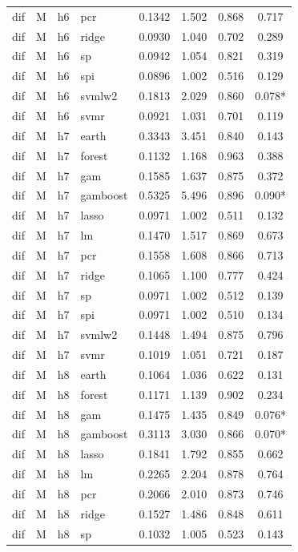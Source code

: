 \begin{ThreePartTable}
\begin{longtable}[t]{llclcccc}
dif & M & h6 & pcr & 0.1342 & 1.502 & 0.868 & 0.717\\
dif & M & h6 & ridge & 0.0930 & 1.040 & 0.702 & 0.289\\
dif & M & h6 & sp & 0.0942 & 1.054 & 0.821 & 0.319\\
dif & M & h6 & spi & 0.0896 & 1.002 & 0.516 & 0.129\\
dif & M & h6 & svmlw2 & 0.1813 & 2.029 & 0.860 & 0.078*\\
dif & M & h6 & svmr & 0.0921 & 1.031 & 0.701 & 0.119\\
\addlinespace
dif & M & h7 & earth & 0.3343 & 3.451 & 0.840 & 0.143\\
dif & M & h7 & forest & 0.1132 & 1.168 & 0.963 & 0.388\\
dif & M & h7 & gam & 0.1585 & 1.637 & 0.875 & 0.372\\
dif & M & h7 & gamboost & 0.5325 & 5.496 & 0.896 & 0.090*\\
dif & M & h7 & lasso & 0.0971 & 1.002 & 0.511 & 0.132\\
dif & M & h7 & lm & 0.1470 & 1.517 & 0.869 & 0.673\\
dif & M & h7 & pcr & 0.1558 & 1.608 & 0.866 & 0.713\\
dif & M & h7 & ridge & 0.1065 & 1.100 & 0.777 & 0.424\\
dif & M & h7 & sp & 0.0971 & 1.002 & 0.512 & 0.139\\
dif & M & h7 & spi & 0.0971 & 1.002 & 0.510 & 0.134\\
dif & M & h7 & svmlw2 & 0.1448 & 1.494 & 0.875 & 0.796\\
dif & M & h7 & svmr & 0.1019 & 1.051 & 0.721 & 0.187\\
\addlinespace
dif & M & h8 & earth & 0.1064 & 1.036 & 0.622 & 0.131\\
dif & M & h8 & forest & 0.1171 & 1.139 & 0.902 & 0.234\\
dif & M & h8 & gam & 0.1475 & 1.435 & 0.849 & 0.076*\\
dif & M & h8 & gamboost & 0.3113 & 3.030 & 0.866 & 0.070*\\
dif & M & h8 & lasso & 0.1841 & 1.792 & 0.855 & 0.662\\
dif & M & h8 & lm & 0.2265 & 2.204 & 0.878 & 0.764\\
dif & M & h8 & pcr & 0.2066 & 2.010 & 0.873 & 0.746\\
dif & M & h8 & ridge & 0.1527 & 1.486 & 0.848 & 0.611\\
dif & M & h8 & sp & 0.1032 & 1.005 & 0.523 & 0.143\\

\end{longtable}
\end{ThreePartTable}
